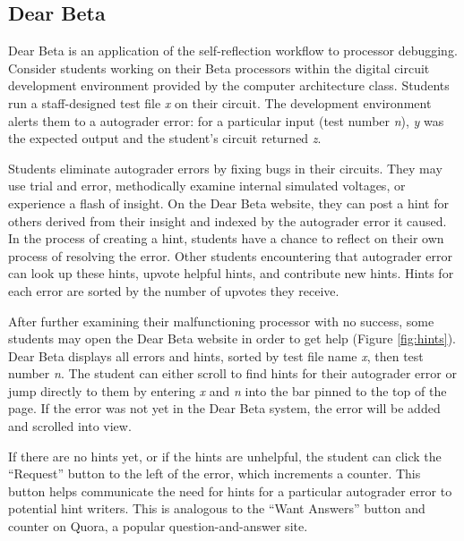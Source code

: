 
\subsection{Dear Beta}

Dear Beta is an application of the self-reflection workflow to processor debugging. Consider students working on their Beta processors within the digital circuit development environment provided by the computer architecture class. Students run a staff-designed test file {\it x} on their circuit. The development environment alerts them to a autograder error: for a particular input (test number {\it n}), {\it y} was the expected output and the student's circuit returned {\it z}. 

Students eliminate autograder errors by fixing bugs in their circuits. They may use trial and error, methodically examine internal simulated voltages, or experience a flash of insight. On the Dear Beta website, they can post a hint for others derived from their insight and indexed by the autograder error it caused. In the process of creating a hint, students have a chance to reflect on their own process of resolving the error.  Other students encountering that autograder error can look up these hints, upvote helpful hints, and contribute new hints. Hints for each error are sorted by the number of upvotes they receive.

After further examining their malfunctioning processor with no success, some students may open the Dear Beta website in order to get help (Figure \ref{fig:hints}). Dear Beta displays all errors and hints, sorted by test file name {\it x}, then test number {\it n}. The student can either scroll to find hints for their autograder error or jump directly to them by entering {\it x} and {\it n} into the bar pinned to the top of the page. If the error was not yet in the Dear Beta system, the error will be added and scrolled into view. 

If there are no hints yet, or if the hints are unhelpful, the student can click the ``Request'' button to the left of the error, which increments a counter. This button helps communicate the need for hints for a particular autograder error to potential hint writers. This is analogous to the ``Want Answers'' button and counter on Quora, a popular question-and-answer site. 

